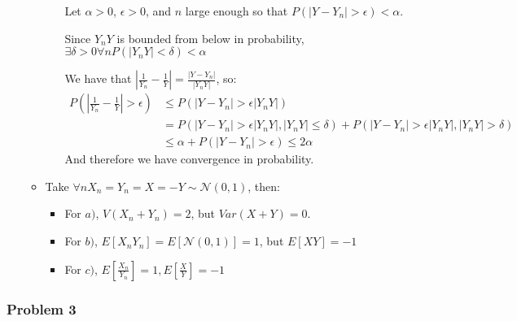\documentclass[12pt]{article}
\newcommand{\Q}[1]{\subsubsection*{Problem #1}}
\begin{document}
\begin{enumerate}
\begin{itemize}
\begin{itemize}
  Let $\alpha > 0$, $\epsilon > 0$, and $n$ large enough so that $ P(|Y - Y_n| > \epsilon) < \alpha$.

  Since $Y_nY$ is bounded from below in probability, $\exists \delta > 0 \forall n P(|Y_nY| < \delta) < \alpha $

  We have that $|\frac1 {Y_n} - \frac1 {Y}| = \frac{|Y - Y_n|}{|Y_nY|}$, so:
  \begin{align*}
    P(|\frac1 {Y_n} - \frac1 {Y}| > \epsilon)
    &\le P(|Y - Y_n| > \epsilon |Y_nY|)
    \\&= P(|Y - Y_n| > \epsilon |Y_nY|, |Y_nY| \le \delta)  + P(|Y - Y_n| > \epsilon |Y_nY|, |Y_nY| > \delta)
    \\&\le \alpha + P(|Y - Y_n| > \epsilon)
        \le 2\alpha
  \end{align*}
  And therefore we have convergence in probability.
\end{itemize}

\item Take $\forall n X_n = Y_n = X = -Y \sim \mathcal N(0,1)$, then:
  \begin{itemize}
  \item For $a)$, $V(X_n+Y_n) = 2$, but $Var(X+Y) = 0$.
  \item For $b)$, $E[X_nY_n] = E[\mathcal N(0, 1)] = 1$, but
    $E[XY] = -1$
  \item For $c)$, $E[\frac{X_n}{Y_n}] = 1, E[\frac{X}{Y}] = -1$
  \end{itemize}
\end{itemize}
\end{enumerate}
\Q{3}
\end{document}
